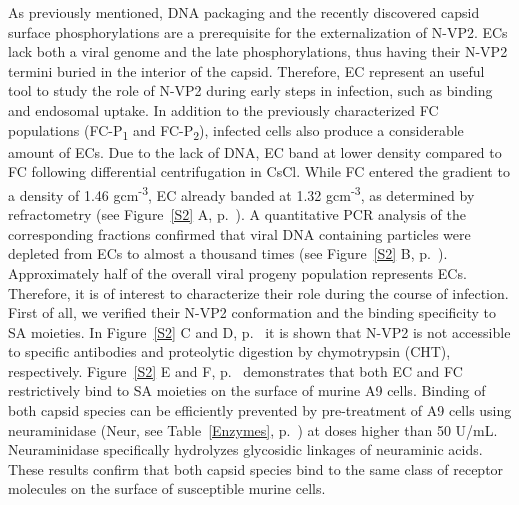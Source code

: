 As previously mentioned, DNA packaging and the recently discovered capsid surface phosphorylations are a prerequisite for the externalization of N-VP2. ECs lack both a viral genome and the late phosphorylations, thus having their N-VP2 termini buried in the interior of the capsid. Therefore, EC represent an useful tool to study the role of N-VP2 during early steps in infection, such as binding and endosomal uptake. In addition to the previously characterized FC populations (FC-P\textsubscript{1} and FC-P\textsubscript{2}), infected cells also produce a considerable amount of ECs. Due to the lack of DNA, EC band at lower density compared to FC following differential centrifugation in CsCl. While FC entered the gradient to a density of 1.46 gcm\textsuperscript{-3}, EC already banded at 1.32 gcm\textsuperscript{-3}, as determined by refractometry (see Figure~\ref{S2} A, p.~\pageref{S2}). A quantitative PCR analysis of the corresponding fractions confirmed that viral DNA containing particles were depleted from ECs to almost a thousand times (see Figure~\ref{S2} B, p.~\pageref{S2}). Approximately half of the overall viral progeny population represents ECs. Therefore, it is of interest to characterize their role during the course of infection. First of all, we verified their N-VP2 conformation and the binding specificity to SA moieties. In Figure~\ref{S2} C and D, p.~\pageref{S2} it is shown that N-VP2 is not accessible to specific antibodies and proteolytic digestion by chymotrypsin (CHT), respectively. Figure~\ref{S2} E and F, p.~\pageref{S2} demonstrates that both EC and FC restrictively bind to SA moieties on the surface of murine A9 cells. Binding of both capsid species can be efficiently prevented by pre-treatment of A9 cells using neuraminidase (Neur, see Table~\ref{Enzymes}, p.~\pageref{Enzymes}) at doses higher than 50 U/mL. Neuraminidase specifically hydrolyzes glycosidic linkages of neuraminic acids. These results confirm that both capsid species bind to the same class of receptor molecules on the surface of susceptible murine cells.           


 
\renewcommand\thempfootnote{\arabic{mpfootnote}}

